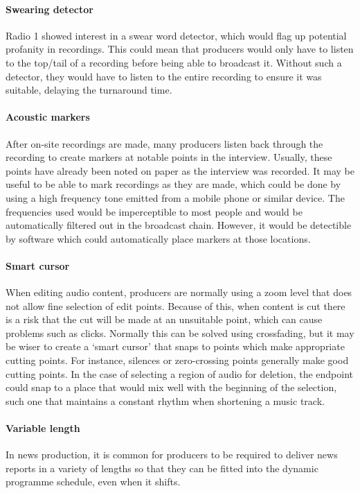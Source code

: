 \paragraph{Swearing detector}
Radio 1 showed interest in a swear word detector, which would flag up potential
profanity in recordings. This could mean that producers would only have to
listen to the top/tail of a recording before being able to broadcast it.
Without such a detector, they would have to listen to the entire recording to
ensure it was suitable, delaying the turnaround time.

\paragraph{Acoustic markers}
After on-site recordings are made, many producers listen back through the
recording to create markers at notable points in the interview. Usually, these
points have already been noted on paper as the interview was recorded. It may
be useful to be able to mark recordings as they are made, which could be done
by using a high frequency tone emitted from a mobile phone or similar device.
The frequencies used would be imperceptible to most people and would be
automatically filtered out in the broadcast chain. However, it would be
detectible by software which could automatically place markers at those
locations.

\paragraph{Smart cursor}
When editing audio content, producers are normally using a zoom level that does
not allow fine selection of edit points. Because of this, when content is cut
there is a risk that the cut will be made at an unsuitable point, which can
cause problems such as clicks. Normally this can be solved using crossfading,
but it may be wiser to create a `smart cursor' that snaps to points which make
appropriate cutting points. For instance, silences or zero-crossing points
generally make good cutting points. In the case of selecting a region of audio
for deletion, the endpoint could snap to a place that would mix well with the
beginning of the selection, such one that maintains a constant rhythm when
shortening a music track.

\paragraph{Variable length}
In news production, it is common for producers to be required to deliver news
reports in a variety of lengths so that they can be fitted into the dynamic
programme schedule, even when it shifts.

